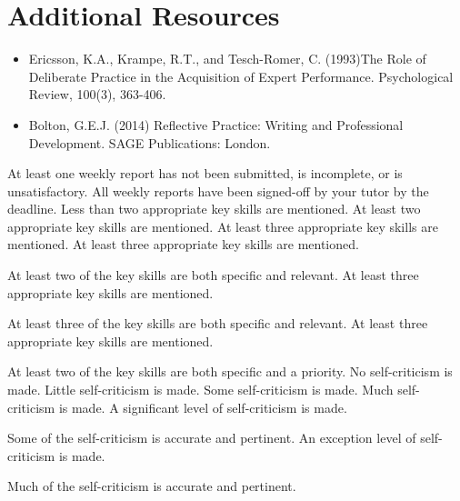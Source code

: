 \documentclass{../fal_assignment}
\begin{document}
\section*{Additional Resources}

\begin{itemize}
    \item Ericsson, K.A., Krampe, R.T., and Tesch-Romer, C. (1993)The Role of Deliberate Practice in the Acquisition of Expert Performance. Psychological Review, 100(3), 363-406.
    \item Bolton, G.E.J. (2014) Reflective Practice: Writing and Professional Development. SAGE Publications: London.
\end{itemize}

\begin{markingrubric}
%
        \grade\fail 	At least one weekly report has not been submitted, is incomplete, or is unsatisfactory.
        \grade 
        \grade 
        \grade 
        \grade 
        \grade 		All weekly reports have been signed-off by your tutor by the deadline.
%
        \grade\fail 	Less than two appropriate key skills are mentioned.
        \grade 		At least two appropriate key skills are mentioned.
        \grade 		At least three appropriate key skills are mentioned.
        \grade 		At least three appropriate key skills are mentioned.
        \par 		At least two of the key skills are both specific and relevant.
        \grade 		At least three appropriate key skills are mentioned.
        \par 		At least three of the key skills are both specific and relevant.
        \grade 		At least three appropriate key skills are mentioned.
        \par 		At least two of the key skills are both specific and a priority.
%
        \grade\fail 	No self-criticism is made.
        \grade 		Little self-criticism is made.
        \grade 		Some self-criticism is made.
        \grade 		Much self-criticism is made.
        \grade 		A significant level of self-criticism is made.
            \par 		Some of the self-criticism is accurate and pertinent.
        \grade 		An exception level of self-criticism is made.
            \par 		Much of the self-criticism is accurate and pertinent.

\end{markingrubric}
\end{document}
